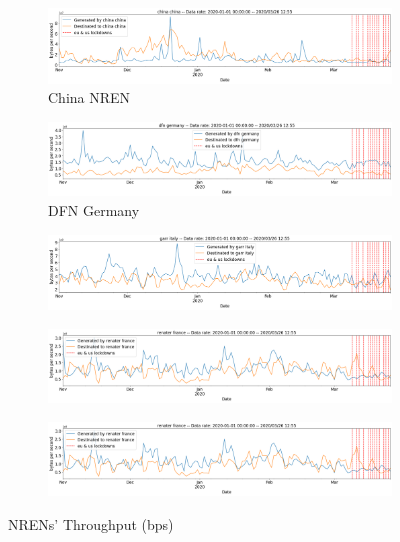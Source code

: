 \documentclass[10pt, journal, letterpaper]{IEEEtran}
\begin{document}
\begin{figure}
\begin{subfigure}{\textwidth}
    \end{subfigure}
    \begin{subfigure}{\textwidth}
          \centering
          \includegraphics[width=\columnwidth]{img/china_bps.png}
          \caption{China NREN}
          \label{fig:china_bps}
    \end{subfigure}
    \begin{subfigure}{\textwidth}
          \centering
          \includegraphics[width=\columnwidth]{img/dfn_bps.png}
          \caption{DFN Germany}
          \label{fig:dfn_bps}
    \end{subfigure}
    \begin{subfigure}{\textwidth}
          \centering
          \includegraphics[width=\columnwidth]{img/garr_bps.png}
          \label{fig:garr_bps}
    \end{subfigure}
    \begin{subfigure}{\textwidth}
          \centering
          \includegraphics[width=\columnwidth]{img/rediris_bps.png}
          \label{fig:rediris_bps}
    \end{subfigure}
    \begin{subfigure}{\textwidth}
          \centering
          \includegraphics[width=\columnwidth]{img/renater_bps.png}
          \label{fig:renater_bps}
    \end{subfigure}
    \caption{NRENs' Throughput (bps)}
    \label{fig:nrens_bps}
\end{figure}
\end{document}
